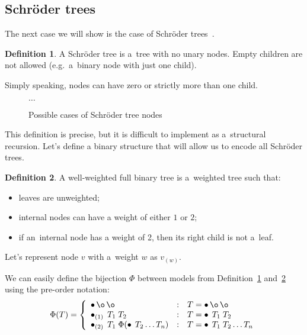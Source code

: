 \documentclass[final]{article}
\theoremstyle{definition}
\newtheorem{definition}{Definition}[subsection]
\theoremstyle{definition}
\theoremstyle{remark}
\newcommand{\weighted}[1]{\ensuremath{_{(#1)}}}
\DeclareMathOperator{\n}{\bullet}
\DeclareMathOperator{\no}{\o}
\begin{document}
\subsection{Schröder trees}%
\label{sub:schröder_trees}

The next case we will show is the case of Schröder trees~\cite{schroder}.

\begin{definition}%
    \label{def:schroder_tree}
    A Schröder tree is a~tree with no unary nodes. Empty children are not allowed (e.g.~a~binary node with just one child).
\end{definition}

Simply speaking, nodes can have zero or strictly more than one child.

\begin{figure}[H]
    \centering
    
    
    
    
    \(\ldots\)
    \caption{Possible cases of Schröder tree nodes}%
    \label{fig:schroder_trees}
\end{figure}

This definition is precise, but it is difficult to implement as a~structural recursion. Let's define a binary structure that will allow us to encode all Schröder trees.

\begin{definition}%
    \label{def:well_weighted}
    A well-weighted full binary tree is a~weighted tree such that:
    \begin{itemize}
        \item leaves are unweighted;
        \item internal nodes can have a weight of either \(1\) or \(2\);
        \item if an~internal node has a weight of 2, then its right child is not a~leaf.
    \end{itemize}
\end{definition}

Let's represent node \(v\) with a~weight \(w\) as \(v\weighted{w}\).

We can easily define the bijection \(\Phi\) between models from Definition~\ref{def:schroder_tree} and~\ref{def:well_weighted} using the pre-order notation:
\[\Phi(T) = \left\{\begin{array}{lcl}
            \n \no \no &:& T = \n \no \no \\
            \n\weighted{1}\; T_1\; T_2 &:& T = \n\; T_1\; T_2\\
            \n\weighted{2}\; T_1\; \Phi(\n\; T_2 \ldots T_n) &:& T = \n\; T_1\; T_2 \ldots T_n
\end{array}\right.\]
\end{document}
